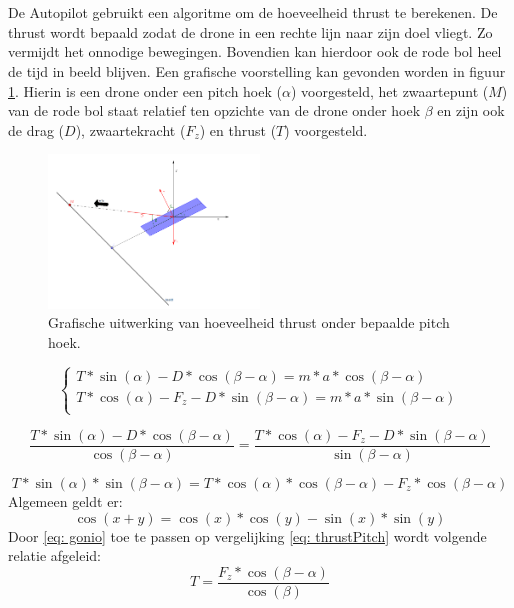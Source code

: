 \\
\\
De Autopilot gebruikt een algoritme om de hoeveelheid thrust te berekenen. De thrust wordt bepaald zodat de drone in een rechte lijn naar zijn doel vliegt. Zo vermijdt het onnodige bewegingen. Bovendien kan hierdoor ook de rode bol heel de tijd in beeld blijven. Een grafische voorstelling kan gevonden worden in figuur \ref{fig:GrafischeUitwerkingVanHoeveelheidThrustOnderBepaaldePitch}. Hierin is een drone onder een pitch hoek (\(\alpha\)) voorgesteld, het zwaartepunt (\(M\)) van de rode bol staat relatief ten opzichte van de drone onder hoek \(\beta\) en zijn ook de drag (\(D\)), zwaartekracht (\(F_z\)) en thrust (\(T\)) voorgesteld.

\begin{figure}[h]
	\centering
	\includegraphics[width=0.5\textwidth]{GrafischeUitwerkingVanHoeveelheidThrustOnderBepaaldePitch.png}
	\caption{Grafische uitwerking van hoeveelheid thrust onder bepaalde pitch hoek.}
	\label{fig:GrafischeUitwerkingVanHoeveelheidThrustOnderBepaaldePitch}
\end{figure}

\begin{equation}
\begin{cases}
T*\sin(\alpha)-D*\cos(\beta-\alpha) = m*a*\cos(\beta-\alpha)\\
T*\cos(\alpha) - F_z - D*\sin(\beta-\alpha) = m*a*\sin(\beta-\alpha)\\
\end{cases}
\end{equation}

\begin{equation}
\frac{T*\sin(\alpha)-D*\cos(\beta-\alpha)}{\cos(\beta-\alpha)} = \frac{T*\cos(\alpha) - F_z - D*\sin(\beta-\alpha)}{\sin(\beta-\alpha)}
\end{equation}

\begin{equation} \label{eq: thrustPitch}
T*\sin(\alpha)*\sin(\beta-\alpha) = T*\cos(\alpha)*\cos(\beta-\alpha)- F_z*\cos(\beta-\alpha)
\end{equation}
Algemeen geldt er:
\begin{equation} \label{eq: gonio}
\cos(x+y) = \cos(x)*\cos(y)-\sin(x)*\sin(y)
\end{equation}
Door \ref{eq: gonio} toe te passen op vergelijking \ref{eq: thrustPitch} wordt volgende relatie afgeleid:
\begin{equation}
T = \frac{ F_z*\cos(\beta-\alpha)}{\cos(\beta)}
\end{equation}

